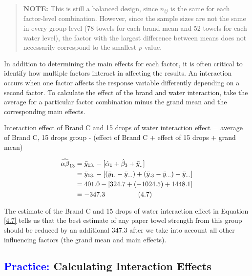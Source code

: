 \documentclass[
]{report}
\begin{document}
\begin{quote}
\textbf{NOTE:} This is still a balanced design, since \(\scriptstyle n_{ij}\) is the same for each factor-level combination. However, since the sample sizes are not the same in every group level (78 towels for each brand mean and 52 towels for each water level), the factor with the largest difference between means does not necessarily correspond to the smallest \(\scriptstyle p\)-value.
\end{quote}

In addition to determining the main effects for each factor, it is often critical to identify how multiple factors interact in affecting the results. An interaction occurs when one factor affects the response variable differently depending on a second factor. To calculate the effect of the brand and water interaction, take the average for a particular factor combination minus the grand mean and the corresponding main effects.

Interaction effect of Brand C and 15 drops of water interaction effect
= average of Brand C, 15 drops group
- (effect of Brand C + effect of 15 drops + grand mean)

\begin{align}
\label{4.7}
\widehat{\alpha\beta}_{13}
&= \bar{y}_{13.} - [\hat{\alpha}_1 + \hat{\beta}_3 + \bar{y}_{..}] \notag \\
&= \bar{y}_{13.} - [(\bar{y}_{1.} - \bar{y}_{...}) + (\bar{y}_{.3} - \bar{y}_{...}) + \bar{y}_{...}] \notag \\
&= 401.0 - [324.7 + (-1024.5) + 1448.1] \notag \\
&= -347.3 \hspace{1cm} 
\tag{4.7}
\end{align}

The estimate of the Brand C and 15 drops of water interaction effect in Equation \ref{4.7} tells us that the best estimate of any paper towel strength from this group should be reduced by an additional 347.3 after we take into account all other influencing factors (the grand mean and main effects).

\hypertarget{calculating-interaction-effects}{%
\subsection*{\texorpdfstring{\textcolor{blue}{Practice:} Calculating Interaction Effects}{ Calculating Interaction Effects}}\label{calculating-interaction-effects}}
\end{document}

